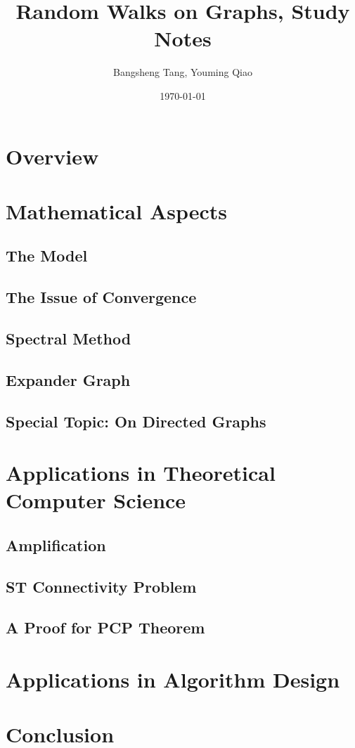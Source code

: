 \documentclass[11pt]{article}
\begin{document}
\title{Random Walks on Graphs, Study Notes}
\author{Bangsheng Tang, Youming Qiao}
\date{\today}
\maketitle

\section{Overview}


\section{Mathematical Aspects}

\subsection{The Model}


\subsection{The Issue of Convergence}


\subsection{Spectral Method}


\subsection{Expander Graph}


\subsection{Special Topic: On Directed Graphs}


\section{Applications in Theoretical Computer Science}

\subsection{Amplification}


\subsection{ST Connectivity Problem}


\subsection{A Proof for PCP Theorem}


\section{Applications in Algorithm Design}


\section{Conclusion}



 
\end{document}
